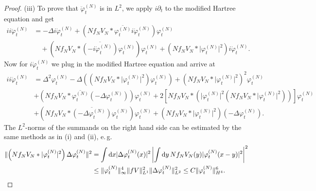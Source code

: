 \documentclass[11pt,a4paper,draft,DIV11]{scrartcl}	%
\newcommand{\di}{\textrm{d}}		%
\newcommand{\cc}[1]{\overline{#1}}	%
\newcommand{\norm}[1]{\lVert#1\rVert}	%
\newcommand{\ph}{\varphi_t^{(N)}}	%
\newcommand{\phdot}{\dot{\varphi}_t^{(N)}}	%
\newcommand{\phddot}{\ddot{\varphi}_t^{(N)}}	%
\begin{document}
\begin{proof}
(iii) To prove that $\phddot$ is in $L^2$, we apply $i\partial_t$ to the modified Hartree equation and get
\begin{align*}
ii\phddot & = - \Delta i \phdot + \left( N f_N V_N \ast \cc{\ph}i \phdot \right) \ph \\
& \quad + \left( N f_N V_N \ast \cc{(-i\phdot)} \ph \right) \ph + \left( N f_N V_N \ast \lvert\ph\rvert^2 \right) i\phdot.
\end{align*}
Now for $i\phdot$ we plug in the modified Hartree equation and arrive at
\begin{align*}
ii \phddot & = \Delta^2 \ph - \Delta \left( (N f_N V_N \ast \lvert \ph\rvert^2)\ph \right) + \left( N f_N V_N \ast \lvert \ph\rvert^2 \right)^2 \ph \\
& + (N f_N V_N \ast \cc{\ph}(-\Delta \ph))\ph + 2 \left[ N f_N V_N \ast \left( \lvert \ph\rvert^2 (N f_N V_N \ast \lvert \ph\rvert^2) \right) \right] \ph \\
& + (N f_N V_N \ast \cc{(-\Delta \ph)} \ph)\ph + \left( N f_N V_N \ast \lvert \ph \rvert^2 \right)(-\Delta \ph).
\end{align*}
The $L^2$-norms of the summands on the right hand side can be estimated by the same methods as in (i) and (ii), e.\,g.\ 
\begin{align*}
 \norm{\left( N f_N V_N \ast \lvert \ph\rvert^2 \right) \Delta \ph}^2 & = \int \di x \lvert \Delta \ph(x)\rvert^2 \left\lvert \int \di y\, N f_N V_N(y) \lvert \ph(x-y) \rvert^2 \right\rvert^2 \\
& \leq \norm{\ph}_\infty^4 \norm{fV}_{L^1}^2 \norm{\Delta \ph}_{L^2}^2 \leq C \norm{\ph}_{H^4}^6. \qedhere
\end{align*}
\end{proof}
\end{document}
